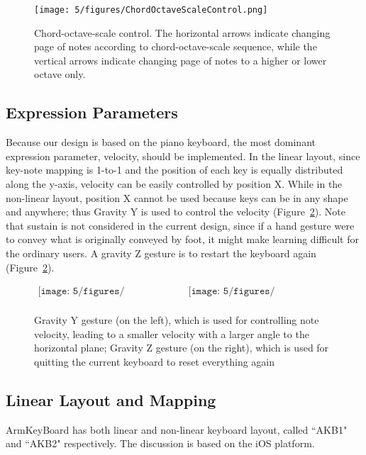 \begin{figure}[htbp]
\centering
\texttt{[image: 5/figures/ChordOctaveScaleControl.png]}
\caption{Chord-octave-scale control. The horizontal arrows indicate changing page of notes according to chord-octave-scale sequence, while the vertical arrows indicate changing page of notes to a higher or lower octave only.}
\label{figChordOctaveScaleControl}
\end{figure}

\subsection{Expression Parameters}
Because our design is based on the piano keyboard, the most dominant expression parameter, velocity, should be implemented. In the
linear layout, since key-note mapping is 1-to-1 and the position of each key is equally distributed along the y-axis, velocity can be easily controlled by position X. While in the non-linear layout, position X cannot be used because keys can be in any shape and anywhere; thus Gravity Y is used to control the velocity (Figure~\ref{fig:5-GravityYZGesture}). Note that sustain is not considered in the current design, since if a hand gesture were to convey what is originally conveyed by foot, it might make learning difficult for the ordinary users. A gravity Z gesture is to restart the keyboard again (Figure~\ref{fig:5-GravityYZGesture}).
\begin{figure}[htbp]
\begin{center}$
\begin{array}{cc}
\texttt{[image: 5/figures/GravityY.jpg]} &
\texttt{[image: 5/figures/GravityZ.jpg]} \\
\end{array}$
\end{center}
\caption{Gravity Y gesture (on the left), which is used for controlling note velocity, leading to a smaller velocity with a larger angle to the horizontal plane; Gravity Z gesture (on the right), which is used for quitting the current keyboard to reset everything again}
\label{fig:5-GravityYZGesture}
\end{figure}

\subsection{Linear Layout and Mapping}
ArmKeyBoard has both linear and non-linear keyboard layout, called ``AKB1" and ``AKB2" respectively. The discussion is based on the iOS platform.

